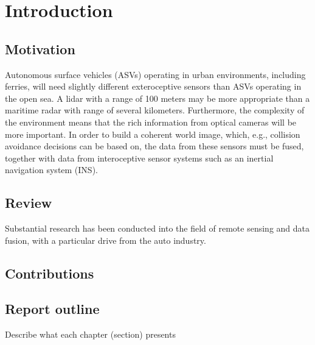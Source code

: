 
\chapter{Introduction}

\section{Motivation}
Autonomous surface vehicles (ASVs) operating in urban environments, including ferries, will need slightly different exteroceptive sensors than ASVs operating in the open sea. A lidar with a range of 100 meters may be more appropriate than a maritime radar with range of several kilometers. Furthermore, the complexity of the environment means that the rich information from optical cameras will be more important. In order to build a coherent world image, which, e.g., collision avoidance decisions can be based on, the data from these sensors must be fused, together with data from interoceptive sensor systems such as an inertial navigation system (INS).
\section{Review}
Substantial research has been conducted into the field of remote sensing and data fusion, with a particular drive from the auto industry.
\section{Contributions}
\section{Report outline}
Describe what each chapter (section) presents

\cleardoublepage